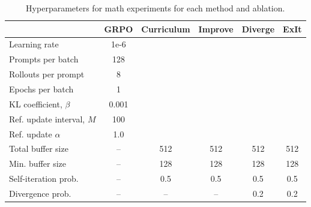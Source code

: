 \begin{table}[htb]
\footnotesize
\centering
\begin{tabular}{l|ccccc}
\toprule
 & \textbf{GRPO} & \textbf{Curriculum} & \textbf{Improve} & \textbf{Diverge} & \textbf{ExIt} \\
\midrule
Learning rate       & 1e-6 &  &  &  &  \\
Prompts per batch  & 128 &  &  &  &  \\
Rollouts per prompt  & 8 &  &  &  &  \\
Epochs per batch     & 1 & & & & \\
KL coefficient, $\beta$ & 0.001 & & & & \\
Ref. update interval, $M$ & 100 & & & & \\
Ref. update $\alpha$  & 1.0 & & & & \\
Total buffer size   & – & 512 & 512 & 512 & 512 \\
Min. buffer size    & – & 128 & 128 & 128 & 128\\
Self-iteration prob. & – & 0.5 & 0.5 & 0.5 & 0.5 \\
Divergence prob.     & – & – & – & 0.2 & 0.2 \\
\bottomrule
\end{tabular}
\caption{Hyperparameters for math experiments for each method and ablation.}
\label{tab:hyperparams_math}
\end{table}
